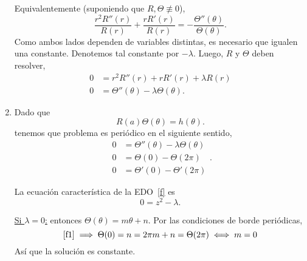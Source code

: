 \begin{Solucion}
\begin{enumerate}[label=(\alph*), topsep=3pt, itemsep=2pt]
	Equivalentemente (suponiendo que \(R, \Theta \not\equiv 0\)),
	\begin{displaymath}
		\frac
			{r^2 R''(r)}
			{R(r)}
		+
		\frac
			{r R'(r)}
			{R(r)}
		=
		-
		\frac
			{\Theta''(\theta)}
			{\Theta(\theta)}.
	\end{displaymath}
	Como ambos lados dependen de variables distintas, es necesario que
	igualen una constante. Denotemos tal constante por \(-\lambda\).
	Luego, \(R\) y \(\Theta\) deben resolver,
	\begin{align*}	
		0 &= r^2 R''(r) + r R'(r) + \lambda R(r) \\
		0 &= \Theta''(\theta) - \lambda \Theta(\theta).
	\end{align*}
\item 
	Dado que 
	\begin{displaymath}
		R(a) \Theta(\theta) = h(\theta).
	\end{displaymath}
	tenemos que problema es periódico en el siguiente sentido,
	\begin{subequations}
	\begin{align}
		\label{f}
		0 &= \Theta''(\theta) - \lambda \Theta(\theta)
		\\
		\label{f1}
		0 &= \Theta(0) - \Theta(2\pi)
		\\
		\label{f2}
		0 &= \Theta'(0) - \Theta'(2\pi)
	\end{align}.
	\end{subequations}

	La ecuación característica de la EDO~\eqref{f} es 
	\begin{displaymath}
		0 = z^2 - \lambda.
	\end{displaymath}

	\underline{Si \(\lambda = 0\):} entonces \(\Theta(\theta) = m
	\theta + n\). Por las condiciones de borde periódicas,
	\begin{displaymath}
		\eqref{f1}
		\implies
		\Theta(0) = n = 2\pi m + n = \Theta(2\pi)
		\iff m = 0
	\end{displaymath}
	Así que la solución es constante. 


\end{enumerate}
\end{Solucion}
